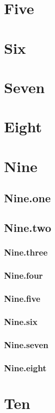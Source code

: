 \documentclass[11 pt]{article}
\begin{document}
\pagebreak

\section{Five}

\section{Six}

\section{Seven}

\pagebreak

\section{Eight}

\pagebreak

\section{Nine}

\subsection{Nine.one}

\subsection{Nine.two}

\subsubsection{Nine.three}

\subsubsection{Nine.four}

\subsubsection{Nine.five}

\subsubsection{Nine.six}

\subsubsection{Nine.seven}

\subsubsection{Nine.eight}

\section{Ten}
\end{document}
